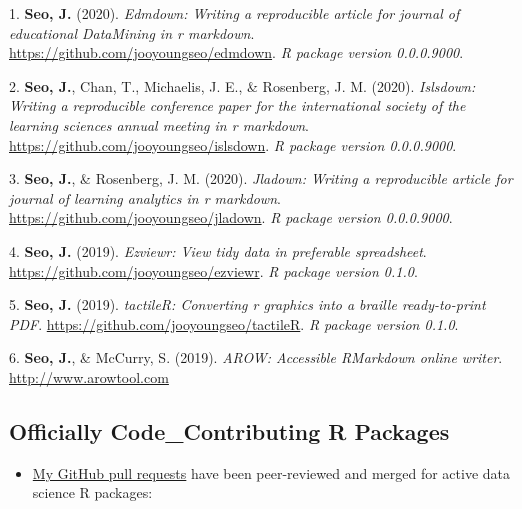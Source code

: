 \documentclass[11pt,a4paper,]{awesome-cv}
\providecommand{\tightlist}{%
	\setlength{\itemsep}{0pt}\setlength{\parskip}{0pt}}
\newlength{\cslhangindent}
\newenvironment{CSLReferences}[2] %
 {\begin{list}{}{%
  \setlength{\itemindent}{0pt}
  \setlength{\leftmargin}{0pt}
  \setlength{\parsep}{0pt}
  \ifodd #1
   \setlength{\leftmargin}{\cslhangindent}
   \setlength{\itemindent}{-1\cslhangindent}
  \fi
  \setlength{\itemsep}{#2\baselineskip}}}
 {\end{list}}
\begin{document}
\label{refs-2061fa253ba446d2f8d9d3810e4746e6}
\begin{CSLReferences}{1}{0}
1. \textbf{Seo, J.} (2020). \emph{Edmdown: Writing a reproducible
article for journal of educational DataMining in r markdown}.
\url{https://github.com/jooyoungseo/edmdown}. \emph{R package version
0.0.0.9000}.

2. \textbf{Seo, J.}, Chan, T., Michaelis, J. E., \& Rosenberg, J. M.
(2020). \emph{Islsdown: Writing a reproducible conference paper for the
international society of the learning sciences annual meeting in r
markdown}. \url{https://github.com/jooyoungseo/islsdown}. \emph{R
package version 0.0.0.9000}.

3. \textbf{Seo, J.}, \& Rosenberg, J. M. (2020). \emph{Jladown: Writing
a reproducible article for journal of learning analytics in r markdown}.
\url{https://github.com/jooyoungseo/jladown}. \emph{R package version
0.0.0.9000}.

4. \textbf{Seo, J.} (2019). \emph{Ezviewr: View tidy data in preferable
spreadsheet}. \url{https://github.com/jooyoungseo/ezviewr}. \emph{R
package version 0.1.0}.

5. \textbf{Seo, J.} (2019). \emph{tactileR: Converting r graphics into a
braille ready-to-print PDF}.
\url{https://github.com/jooyoungseo/tactileR}. \emph{R package version
0.1.0}.

6. \textbf{Seo, J.}, \& McCurry, S. (2019). \emph{AROW: Accessible
RMarkdown online writer}. \url{http://www.arowtool.com}

\end{CSLReferences}

\subsection{Officially Code\_Contributing R
Packages}\label{officially-code_contributing-r-packages}

\begin{itemize}
\tightlist
\item
  \href{https://github.com/pulls?q=is\%3Apr+author\%3Ajooyoungseo+archived\%3Afalse+is\%3Aclosed}{My
  GitHub pull requests} have been peer-reviewed and merged for active
  data science R packages:
\end{itemize}
\end{document}
